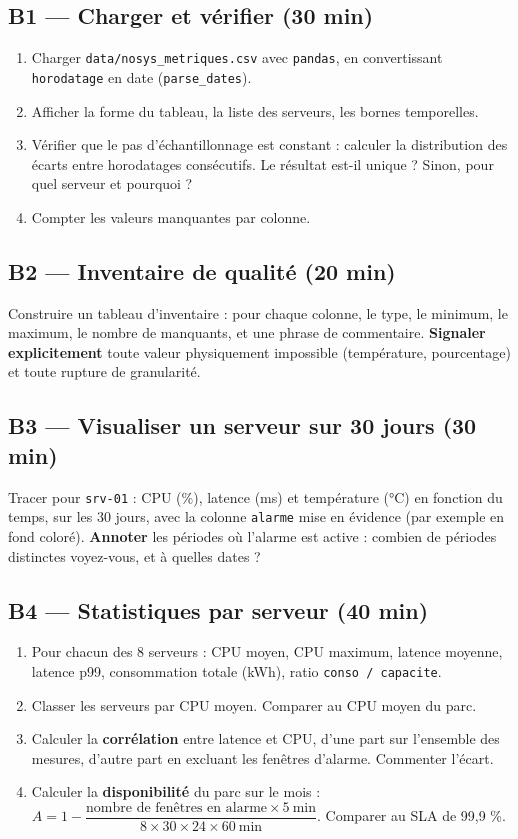 \documentclass[11pt,a4paper]{article}
\newcommand{\py}[1]{\texttt{\small #1}}
\newcommand{\file}[1]{\texttt{\small #1}}
\begin{document}
\subsection*{B1 --- Charger et vérifier (30 min)}
\begin{enumerate}
\item Charger \file{data/nosys\_metriques.csv} avec \py{pandas}, en convertissant
\file{horodatage} en date (\py{parse\_dates}).
\item Afficher la forme du tableau, la liste des serveurs, les bornes
temporelles.
\item Vérifier que le pas d'échantillonnage est constant : calculer la
distribution des écarts entre horodatages consécutifs. Le résultat est-il
unique ? Sinon, pour quel serveur et pourquoi ?
\item Compter les valeurs manquantes par colonne.
\end{enumerate}

\subsection*{B2 --- Inventaire de qualité (20 min)}
Construire un tableau d'inventaire : pour chaque colonne, le type, le minimum,
le maximum, le nombre de manquants, et une phrase de commentaire.
\textbf{Signaler explicitement} toute valeur physiquement impossible
(température, pourcentage) et toute rupture de granularité.

\subsection*{B3 --- Visualiser un serveur sur 30 jours (30 min)}
Tracer pour \file{srv-01} : CPU (\%), latence (ms) et température (°C) en
fonction du temps, sur les 30 jours, avec la colonne \file{alarme} mise en
évidence (par exemple en fond coloré). \textbf{Annoter} les périodes où
l'alarme est active : combien de périodes distinctes voyez-vous, et à quelles
dates ?

\subsection*{B4 --- Statistiques par serveur (40 min)}
\begin{enumerate}
\item Pour chacun des 8 serveurs : CPU moyen, CPU maximum, latence moyenne,
latence p99, consommation totale (kWh), ratio \py{conso / capacite}.
\item Classer les serveurs par CPU moyen. Comparer au CPU moyen du parc.
\item Calculer la \textbf{corrélation} entre latence et CPU, d'une part sur
l'ensemble des mesures, d'autre part en excluant les fenêtres d'alarme.
Commenter l'écart.
\item Calculer la \textbf{disponibilité} du parc sur le mois :
$A = 1 - \dfrac{\text{nombre de fenêtres en alarme} \times 5\ \text{min}}
{8 \times 30 \times 24 \times 60\ \text{min}}$.
Comparer au SLA de 99,9 \%.
\end{enumerate}
\end{document}

